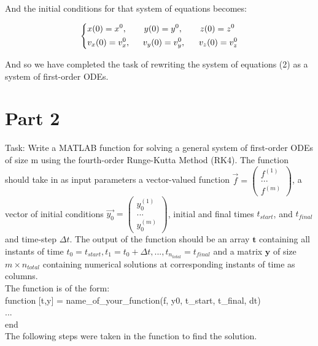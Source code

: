 \documentclass[12pt]{article}
\begin{document}
And the initial conditions for that system of equations becomes:

\begin{equation}
\begin{dcases}
x(0) = x^{0}, \hspace{.7cm}y(0) = y^{0}, \hspace{.7cm}z(0) = z^{0}\\
v_{x}(0) = v_{x}^{0}, \hspace{.52cm}v_{y}(0) = v_{y}^{0}, \hspace{.55cm}v_{z}(0) = v_{z}^{0}
\end{dcases}
\end{equation}

And so we have completed the task of rewriting the system of equations (2) as a system of first-order ODEs.
\newpage
\section*{Part 2}\label{sec::Part 2}
\noindent Task: Write a MATLAB function for solving a general system of first-order ODEs of size m using the fourth-order Runge-Kutta Method (RK4). The function should take in as input parameters a vector-valued function $\vec{f} = \begin{pmatrix}f^{(1)}\\...\\f^{(m)}\end{pmatrix}$, a vector of initial conditions $\vec{y_{0}} = \begin{pmatrix}y_{0}^{(1)}\\...\\y_{0}^{(m)}\end{pmatrix}$, initial and final times $t_{start}$, and $t_{final}$ and time-step $\Delta t$. The output of the function should be an array $\textbf{t}$ containing all instants of time $t_{0} = t_{start}, t_{1} = t_{0} + \Delta t, . . ., t_{n_{total}} = t_{final}$ and a matrix $\textbf{y}$ of size $m\times n_{total}$ containing numerical solutions at corresponding instants of time as columns.\\
\indent The function is of the form:\\
function [t,y] = name\_of\_your\_function(f, y0, t\_start, t\_final, dt)\\
...\\
end\\

\noindent The following steps were taken in the function to find the solution.\\
\end{document}
